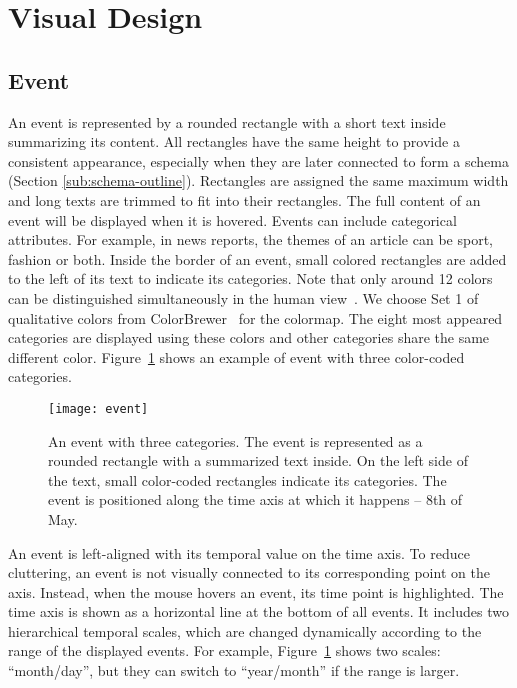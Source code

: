 \section{Visual Design}
\label{sec:interface}

\subsection{Event}
An event is represented by a rounded rectangle with a short text inside summarizing its content. All rectangles have the same height to provide a consistent appearance, especially when they are later connected to form a schema (Section \ref{sub:schema-outline}). Rectangles are assigned the same maximum width and long texts are trimmed to fit into their rectangles. The full content of an event will be displayed when it is hovered. Events can include categorical attributes. For example, in news reports, the themes of an article can be sport, fashion or both. Inside the border of an event, small colored rectangles are added to the left of its text to indicate its categories. Note that only around 12 colors can be distinguished simultaneously in the human view~\cite{Munzner2014}. We choose Set 1 of qualitative colors from ColorBrewer~\cite{Harrower2003} for the colormap. The eight most appeared categories are displayed using these colors and other categories share the same different color. Figure~\ref{fig:event} shows an example of event with three color-coded categories.

\begin{figure}[ht]
\centering
\texttt{[image: event]}
\caption{An event with three categories. The event is represented as a rounded rectangle with a summarized text inside. On the left side of the text, small color-coded rectangles indicate its categories. The event is positioned along the time axis at which it happens -- 8th of May.}
\label{fig:event}
\end{figure}

An event is left-aligned with its temporal value on the time axis. To reduce cluttering, an event is not visually connected to its corresponding point on the axis. Instead, when the mouse hovers an event, its time point is highlighted. The time axis is shown as a horizontal line at the bottom of all events. It includes two hierarchical temporal scales, which are changed dynamically according to the range of the displayed events. For example, Figure~\ref{fig:event} shows two scales: ``month/day'', but they can switch to ``year/month'' if the range is larger.

